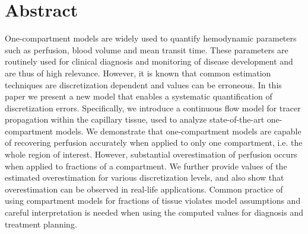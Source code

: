 \documentclass[10pt]{article}
\begin{document}
\newcommand{\missingsource}{\textcolor{red}{[?]}}
\newlength{\fwd}
\newlength{\fht}

\section{Abstract}
One-compartment models are widely used to quantify hemodynamic parameters such as perfusion, blood volume and mean transit time. These parameters are routinely used for clinical diagnosis and monitoring of disease development and are thus of high relevance. However, it is known that common estimation techniques are discretization dependent and values can be erroneous. In this paper we present a new model that enables a systematic quantification of discretization errors. Specifically, we introduce a continuous flow model for tracer propagation within the capillary tissue, used to analyze state-of-the-art one-compartment models. We demonstrate that one-compartment models are capable of recovering perfusion accurately when applied to only one compartment, i.e. the whole region of interest. However, substantial overestimation of perfusion occurs when applied to fractions of a compartment. We further provide values of the estimated overestimation for various discretization levels, and also show that overestimation can be observed in real-life applications. Common practice of using compartment models for fractions of tissue violates model assumptions and careful interpretation is needed when using the computed values for diagnosis and treatment planning.



\linenumbers
\end{document}
